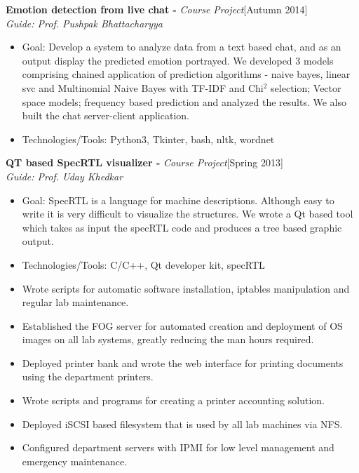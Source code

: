\documentclass[a4paper,10pt]{article}
\newcommand{\header}[1]{
\begin{center}
\fbox{\begin{minipage}{\textwidth}
\raggedright \large \bf #1
\end{minipage}}
\end{center}
\vspace{-0.3cm}
}
\begin{document}
\noindent
\textbf{Emotion detection from live chat -} \emph{Course Project}\hfill[Autumn 2014] \\
\emph{Guide: Prof. Pushpak Bhattacharyya}
\begin{itemize}
 \item Goal: Develop a system to analyze data from a text based chat, and as an output display the predicted emotion portrayed. We developed 3 models comprising chained application of prediction algorithms - naive bayes, linear svc and Multinomial Naive Bayes with TF-IDF and Chi$^2$ selection; Vector space models; frequency based prediction and analyzed the results. We also built the chat server-client application.
 \item Technologies/Tools: Python3, Tkinter, bash, nltk, wordnet
\end{itemize}

\noindent
\textbf{QT based SpecRTL  visualizer -} \emph{Course Project}\hfill[Spring 2013] \\
\emph{Guide: Prof. Uday Khedkar}
\begin{itemize}
 \item Goal: SpecRTL is a language for machine descriptions. Although easy to write it is very difficult to visualize the structures. We wrote a Qt based tool which takes as input the specRTL code and produces a tree based graphic output.
 \item Technologies/Tools: C/C++, Qt developer kit, specRTL
\end{itemize}
\endgroup

\vspace{-0.8cm}
\header{RA Work - System Administrator}
\vspace{-0.2cm}
\begin{itemize}
 \item Wrote scripts for automatic software installation, iptables manipulation and regular lab maintenance.
 \item Established the FOG server for automated creation and deployment of OS images on all lab systems, greatly reducing the man hours required.
 \item Deployed printer bank and wrote the web interface for printing documents using the department printers.
 \item Wrote scripts and programs for creating a printer accounting solution.
 \item Deployed iSCSI based filesystem that is used by all lab machines via NFS.
 \item Configured department servers with IPMI for low level management and emergency maintenance.
\end{itemize}
\end{document}
